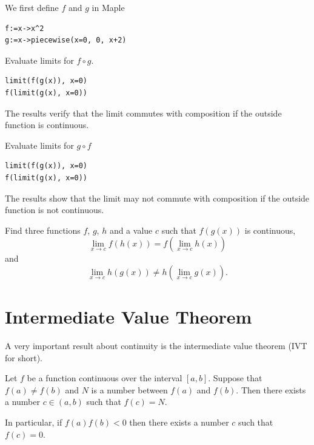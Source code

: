\documentclass[]{book}
\theoremstyle{definition}
\theoremstyle{definition}
\theoremstyle{definition}
\theoremstyle{remark}
\let\BeginKnitrBlock\begin \let\EndKnitrBlock\end
\begin{document}
\BeginKnitrBlock{solution}
{}We first define \(f\) and \(g\) in Maple

\begin{verbatim}
f:=x->x^2
g:=x->piecewise(x=0, 0, x+2)
\end{verbatim}

Evaluate limits for \(f\circ g\).

\begin{verbatim}
limit(f(g(x)), x=0)
f(limit(g(x), x=0))
\end{verbatim}

The results verify that the limit commutes with composition if the outside function is continuous.

Evaluate limits for \(g\circ f\)

\begin{verbatim}
limit(f(g(x)), x=0)
f(limit(g(x), x=0))
\end{verbatim}

The results show that the limit may not commute with composition if the outside function is not continuous.
\EndKnitrBlock{solution}

\BeginKnitrBlock{exercise}
\protect\hypertarget{exr:unnamed-chunk-39}{}{\label{exr:unnamed-chunk-39} }
Find three functions \(f\), \(g\), \(h\) and a value \(c\) such that \(f(g(x))\) is continuous,
\[
\lim\limits_{x\to c}f(h(x))=f(\lim\limits_{x\to c}h(x))
\]
and
\[
\lim\limits_{x\to c}h(g(x))\neq h(\lim\limits_{x\to c}g(x)).
\]
\EndKnitrBlock{exercise}

\hypertarget{intermediate-value-theorem}{%
\section{Intermediate Value Theorem}\label{intermediate-value-theorem}}

A very important result about continuity is the intermediate value theorem (IVT for short).

\BeginKnitrBlock{theorem}[Intermediate Value Theorem]
\protect\hypertarget{thm:unnamed-chunk-40}{}{\label{thm:unnamed-chunk-40} {} }Let \(f\) be a function continuous over the interval \([a, b]\). Suppose that \(f(a)\neq f(b)\) and \(N\) is a number between \(f(a)\) and \(f(b)\). Then there exists a number \(c\in (a, b)\) such that \(f(c)=N\).

In particular, if \(f(a)f(b)<0\) then there exists a number \(c\) such that \(f(c)=0\).
\EndKnitrBlock{theorem}
\end{document}
